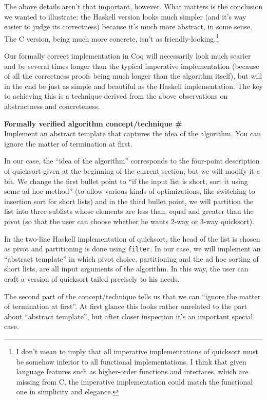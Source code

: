 \documentclass[declaration,mgr,english,shortabstract]{iithesis}
\newcommand{\m}[1]{\texttt{#1}}
\newcounter{cnt}
\newcommand{\runcnt}{\#\arabic{cnt}}
\newcommand{\concept}[1]
{
    \refstepcounter{cnt}
    \begin{center}
        \textbf{Formally verified algorithm concept/technique \runcnt} \\
        #1
    \end{center}
}
\begin{document}
The above details aren't that important, however. What matters is the conclusion we wanted to illustrate: the Haskell version looks much simpler (and it's way easier to judge its correctness) because it's much more abstract, in some sense. The C version, being much more concrete, isn't as friendly-looking.\footnote{I don't mean to imply that all imperative implementations of quicksort must be somehow inferior to all functional implementations. I think that given language features such as higher-order functions and interfaces, which are missing from C, the imperative implementation could match the functional one in simplicity and elegance.}

Our formally correct implementation in Coq will necessarily look much scarier and be several times longer than the typical imperative implementation (because of all the correctness proofs being much longer than the algorithm itself), but will in the end be just as simple and beautiful as the Haskell implementation. The key to achieving this is a technique derived from the above observations on abstractness and concreteness.

\concept{Implement an abstract template that captures the idea of the algorithm. You can ignore the matter of termination at first.}

In our case, the ``idea of the algorithm'' corresponds to the four-point description of quicksort given at the beginning of the current section, but we will modify it a bit. We change the first bullet point to ``if the input list is short, sort it using some ad hoc method'' (to allow various kinds of optimizations, like switching to insertion sort for short lists) and in the third bullet point, we will partition the list into three sublists whose elements are less than, equal and greater than the pivot (so that the user can choose whether he wants 2-way or 3-way quicksort).

In the two-line Haskell implementation of quicksort, the head of the list is chosen as pivot and partitioning is done using \m{filter}. In our case, we will implement an ``abstract template'' in which pivot choice, partitioning and the ad hoc sorting of short lists, are all input arguments of the algorithm. In this way, the user can craft a version of quicksort tailed precisely to his needs.

The second part of the concept/technique tells us that we can ``ignore the matter of termination at first''. At first glance this looks rather unrelated to the part about ``abstract template'', but after closer inspection it's an important special case.
\end{document}
